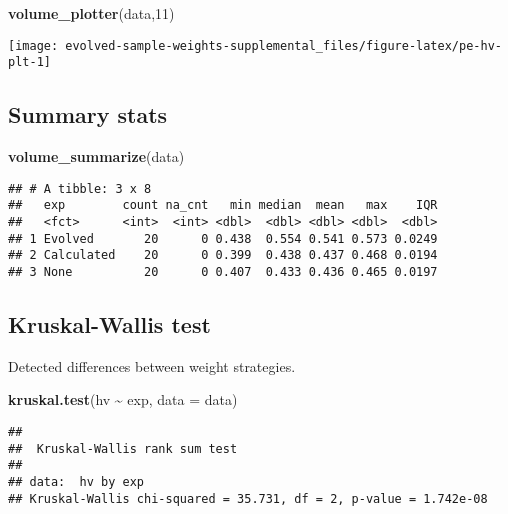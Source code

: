 \documentclass[
]{book}
\newenvironment{Shaded}{\begin{snugshade}}{\end{snugshade}}
\newcommand{\AttributeTok}[1]{\textcolor[rgb]{0.13,0.29,0.53}{#1}}
\newcommand{\DecValTok}[1]{\textcolor[rgb]{0.00,0.00,0.81}{#1}}
\newcommand{\FunctionTok}[1]{\textcolor[rgb]{0.13,0.29,0.53}{\textbf{#1}}}
\newcommand{\NormalTok}[1]{#1}
\newcommand{\SpecialCharTok}[1]{\textcolor[rgb]{0.81,0.36,0.00}{\textbf{#1}}}
\begin{document}
\begin{Shaded}
\begin{Highlighting}[]
\FunctionTok{volume\_plotter}\NormalTok{(data,}\DecValTok{11}\NormalTok{)}
\end{Highlighting}
\end{Shaded}

\texttt{[image: evolved-sample-weights-supplemental\_files/figure-latex/pe-hv-plt-1]}

\hypertarget{summary-stats-10}{%
\subsection{Summary stats}\label{summary-stats-10}}

\begin{Shaded}
\begin{Highlighting}[]
\FunctionTok{volume\_summarize}\NormalTok{(data)}
\end{Highlighting}
\end{Shaded}

\begin{verbatim}
## # A tibble: 3 x 8
##   exp        count na_cnt   min median  mean   max    IQR
##   <fct>      <int>  <int> <dbl>  <dbl> <dbl> <dbl>  <dbl>
## 1 Evolved       20      0 0.438  0.554 0.541 0.573 0.0249
## 2 Calculated    20      0 0.399  0.438 0.437 0.468 0.0194
## 3 None          20      0 0.407  0.433 0.436 0.465 0.0197
\end{verbatim}

\hypertarget{kruskal-wallis-test-10}{%
\subsection{Kruskal-Wallis test}\label{kruskal-wallis-test-10}}

Detected differences between weight strategies.

\begin{Shaded}
\begin{Highlighting}[]
\FunctionTok{kruskal.test}\NormalTok{(hv }\SpecialCharTok{\textasciitilde{}}\NormalTok{ exp, }\AttributeTok{data =}\NormalTok{ data)}
\end{Highlighting}
\end{Shaded}

\begin{verbatim}
## 
##  Kruskal-Wallis rank sum test
## 
## data:  hv by exp
## Kruskal-Wallis chi-squared = 35.731, df = 2, p-value = 1.742e-08
\end{verbatim}
\end{document}

